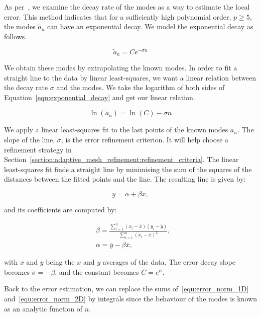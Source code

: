 As per~\cite{Mavriplis1990}, we examine the decay rate of the modes as a way to estimate the local
error. This method indicates that for a sufficiently high polynomial order, \(p \geq 5\), the modes
\(\widetilde{a}_n\) can have an exponential decay. We model the exponential decay as follows.

\begin{equation} \label{equ:exponential_decay}
	\widetilde{a}_n = Ce^{-\sigma n}
\end{equation}

We obtain these modes by extrapolating the known modes. In order to fit a straight line to the data
by linear least-squares, we want a linear relation between the decay rate \(\sigma \) and the modes.
We take the logarithm of both sides of Equation~\ref{equ:exponential_decay} and get our linear
relation.

\begin{equation} \label{equ:exponential_decay_linear}
	\ln(\widetilde{a}_n) = \ln(C) - \sigma n
\end{equation}

We apply a linear least-squares fit to the last points of the known modes \(a_n\). The slope of the
line, \(\sigma \), is the error refinement criterion. It will help choose a refinement strategy in
Section~\ref{section:adaptive_mesh_refinement:refinement_criteria}. The linear least-squares fit
finds a straight line by minimising the sum of the squares of the distances between the fitted
points and the line. The resulting line is given by:

\begin{equation}
	y = \alpha + \beta x,
\end{equation}

\noindent
and its coefficients are computed by:

\begin{align}
	& \beta = \frac{\sum_{i = 1}^{n}(x_i - \overline{x})(y_i - \overline{y})}{\sum_{i = 1}^{n}{(x_i -\overline{x})}^2}, \\
	& \alpha = \overline{y} - \beta \overline{x},
\end{align}

\noindent
with \(\overline{x}\) and \(\overline{y}\) being the \(x\) and \(y\) averages of the data. The error
decay slope becomes \(\sigma = - \beta \), and the constant becomes \(C = e^\alpha \).

Back to the error estimation, we can replace the sums of~\ref{equ:error_norm_1D}
and~\ref{equ:error_norm_2D} by integrals since the behaviour of the modes is known as an analytic
function of \(n\).

